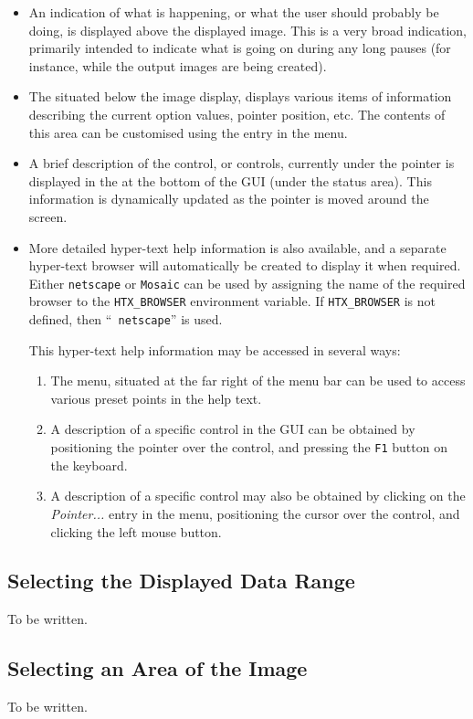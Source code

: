\begin{itemize}

\item An indication of what is happening, or what the user should
probably be doing, is displayed above the displayed image. This is a very
broad indication, primarily intended to indicate what is going on during
any long pauses (for instance, while the output images are being
created).

\item The  situated below
the image display, displays various items of information describing the
current option values, pointer position, etc. The
contents of this area can be customised using the  entry in the  menu.

\item A brief description of the control, or controls, currently under the
pointer is displayed in the  at the
bottom of the GUI (under the status area). This information is
dynamically updated as the pointer is moved around the screen.

\item More detailed hyper-text help information is also available, and a
separate hyper-text browser will automatically be created to display it
when required. Either {\tt netscape} or {\tt Mosaic} can be used by
assigning the name of the required browser to the {\tt HTX\_BROWSER}
environment variable. If {\tt HTX\_BROWSER} is not defined, then ``{\tt
netscape}'' is used.

This hyper-text help information may be accessed in several ways:

\begin{enumerate}

\item The  menu, situated at the
far right of the menu bar can be used to access various preset points in
the help text.

\item A description of a specific control in the GUI can be obtained by 
positioning the pointer over the control, and pressing the {\tt F1}
button on the keyboard.

\item A description of a specific control may also be obtained by clicking 
on the {\em Pointer...} entry in the  menu, positioning the cursor over the control,
and clicking the left mouse button. 

\end{enumerate}

\end{itemize}

\subsection {Selecting the Displayed Data Range}
To be written.

\subsection {Selecting an Area of the Image}
To be written.


